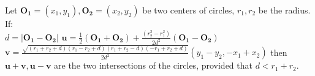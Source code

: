 Let $\mathbf{O_1} = (x_1, y_1), \mathbf{O_2} = (x_2, y_2)$ be two centers of circles,  $r_1,r_2$ be the radius. If:\\
$ d = | \mathbf{O_1} - \mathbf{O_2} | $
$ \mathbf{u} = \frac{ 1 }{ 2 } ( \mathbf{O_1} + \mathbf{O_2} )+ 
\frac{ ( r_2^2 - r_1^2 )  }
{ 2 d^2 } ( \mathbf{O_1} - \mathbf{O_2} )$ \\
$ \mathbf{v} = \frac{ \sqrt{(r_1+r_2+d) (r_1-r_2+d) (r_1+r_2-d) (-r_1+r_2+d)} }{ 2 d^2 } ( y_1 - y_2 , -x_1 + x_2 )$
then $ \mathbf{u} + \mathbf{v} , \mathbf{u} - \mathbf{v} $
are the two intersections of the circles, provided that $ d < r_1 + r_2 $.

